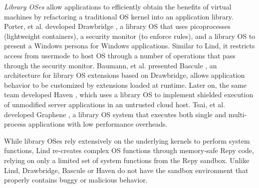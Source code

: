 \textit{Library OSes}
allow applications to efficiently obtain the benefits of virtual machines
by refactoring a traditional OS kernel into an application library.
Porter, et al. developed Drawbridge \cite{Drawbridge-11},
a library OS that uses picoprocesses (lightweight containers),
a security monitor (to enforce rules),
and a library OS to present a Windows persona for %
Windows applications. Similar to Lind,
it restricts access from usermode to host OS through a number
of operations that pass through the security monitor.
%
%
Baumann, et al. presented Bascule \cite{Bascule}, an architecture for library OS extensions
based on Drawbridge, allows application behavior to be customized by
extensions loaded at runtime. Later on, the same team developed Haven \cite{Haven},
which uses a library OS to implement
shielded execution of unmodified server applications
in an untrusted cloud host.
Tsai, et al. developed Graphene \cite{Graphene-14}, a library OS system that
executes both single and
multi-process applications with low performance overheads.

While library OSes rely extensively on
the underlying kernels to perform system functions,
Lind re-creates complex OS functions through memory-safe Repy
code, relying on only a limited set of system functions from the Repy
sandbox. Unlike Lind, Drawbridge, Bascule or Haven
do not have the sandbox environment that properly contains
buggy or malicious behavior. 
